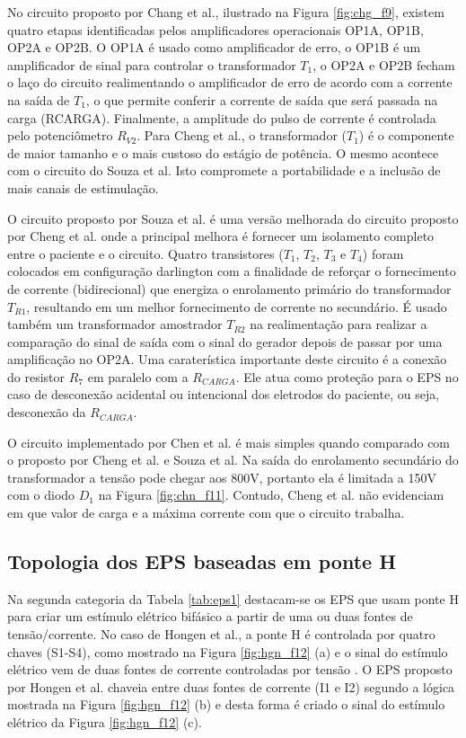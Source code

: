 No circuito proposto por Chang et al., ilustrado na Figura \ref{fig:chg_f9}, existem quatro etapas identificadas pelos amplificadores operacionais OP1A, OP1B, OP2A e OP2B. O OP1A é usado como amplificador de erro, o OP1B é um amplificador de sinal para controlar o transformador $T_{1}$, o OP2A e OP2B fecham o laço do circuito realimentando o amplificador de erro de acordo com a corrente na saída de $T_{1}$, o que permite conferir a corrente de saída que será passada na carga (RCARGA). Finalmente, a amplitude do pulso de corrente é controlada pelo potenciômetro $R_{V2}$. Para Cheng et al., o transformador ($T_{1}$) é o componente de maior tamanho e o mais custoso do estágio de potência. O mesmo acontece com o circuito do Souza et al. Isto compromete a portabilidade e a inclusão de mais canais de estimulação.

O circuito proposto por Souza et al. é uma versão melhorada do circuito proposto por Cheng et al. onde a principal melhora é fornecer um isolamento completo entre o paciente e o circuito. Quatro transistores ($T_{1}$, $T_{2}$, $T_{3}$ e $T_{4}$) foram colocados em configuração darlington com a finalidade de reforçar o fornecimento de corrente (bidirecional) que energiza o enrolamento primário do transformador $T_{R1}$, resultando em um melhor fornecimento de corrente no secundário. É usado também um transformador amostrador $T_{R2}$ na realimentação para realizar a comparação do sinal de saída com o sinal do gerador depois de passar por uma amplificação no OP2A. Uma caraterística importante deste circuito é a conexão do resistor $R_{7}$ em paralelo com a $R_{CARGA}$. Ele atua como proteção para o \acrshort{EPS} no caso de desconexão acidental ou intencional dos eletrodos do paciente, ou seja, desconexão da $R_{CARGA}$.

O circuito implementado por Chen et al. é mais simples quando comparado com o proposto por Cheng et al. e Souza et al. Na saída do enrolamento secundário do transformador a tensão pode chegar aos 800V, portanto ela é limitada a 150V com o diodo $D_{1}$ na Figura \ref{fig:chn_f11}. Contudo, Cheng et al. não evidenciam em que valor de carga e a máxima corrente com que o circuito trabalha.

\subsection*{Topologia dos \acrshort{EPS} baseadas em ponte H}

Na segunda categoria da Tabela \ref{tab:eps1} destacam-se os \acrshort{EPS} que usam ponte H para criar um estímulo elétrico bifásico a partir de uma ou duas fontes de tensão/corrente.
No caso de Hongen et al., a ponte H é controlada por quatro chaves (S1-S4), como mostrado na Figura \ref{fig:hgn_f12} (a) e o sinal do estímulo elétrico vem de duas fontes de corrente controladas por tensão \cite{Hongen2011DevelopmentRehabilitation}. O EPS proposto por Hongen et al. chaveia entre duas fontes de corrente (I1 e I2) segundo a lógica mostrada na Figura \ref{fig:hgn_f12} (b) e desta forma é criado o sinal do estímulo elétrico da Figura \ref{fig:hgn_f12} (c).

